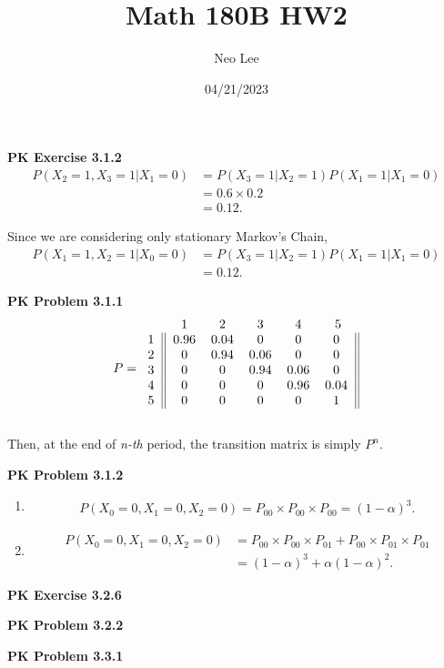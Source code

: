 \documentclass{article}
\title{Math 180B HW2}
\author{Neo Lee}
\date{04/21/2023}
\begin{document}
 

\maketitle 
\textbf{PK Exercise 3.1.2}
\begin{align}
    P(X_2 = 1, X_3 = 1|X_1 = 0) &= P(X_3=1|X_2=1)P(X_1=1|X_1=0) \nonumber \\
    & = 0.6 \times 0.2 \nonumber \\
    & = 0.12. \nonumber 
\end{align}

Since we are considering only stationary Markov's Chain,
\begin{align}
    P(X_1 = 1, X_2 = 1|X_0 = 0) &= P(X_3=1|X_2=1)P(X_1=1|X_1=0) \nonumber \\
    &= 0.12. \nonumber
\end{align}
\bigbreak


\textbf{PK Problem 3.1.1}
\begin{align}
    P = 
    \begin{blockarray}{cccccc}
        & 1 & 2 & 3 & 4 & 5 \\
        \begin{block}{c||ccccc||}
          1 & 0.96 & 0.04 & 0 & 0 & 0 \\
          2 & 0 & 0.94 & 0.06 & 0 & 0 \\
          3 & 0 & 0 & 0.94 & 0.06 & 0 \\
          4 & 0 & 0 & 0 & 0.96 & 0.04 \\
          5 & 0 & 0 & 0 & 0 & 1 \\
        \end{block}
    \end{blockarray} \nonumber
\end{align}

Then, at the end of \emph{n-th} period, the transition matrix is simply $P^n$.
\bigbreak


\textbf{PK Problem 3.1.2}
\begin{enumerate}[label=(\alph*)]
    \item \begin{align}
        P(X_0=0, X_1=0, X_2=0) = P_{00}\times P_{00}\times P_{00} = (1-\alpha)^3. \nonumber
    \end{align}

    \item \begin{align}
        P(X_0=0, X_1=0, X_2=0) & = P_{00}\times P_{00}\times P_{01} + P_{00}\times P_{01}\times P_{01} \nonumber \\
        & = (1-\alpha)^3 + \alpha(1-\alpha)^2. \nonumber
    \end{align}
\end{enumerate}
\bigbreak


\textbf{PK Exercise 3.2.6}

\bigbreak


\textbf{PK Problem 3.2.2}

\bigbreak


\textbf{PK Problem 3.3.1}
\end{document}
